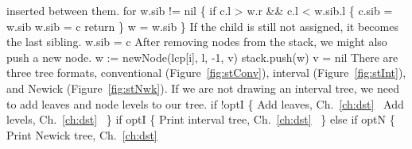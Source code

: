 inserted between them.
\nwenddocs{}\endmoddef\nwstartdeflinemarkup{}\nwenddeflinemarkup
for w.sib != nil \{
          if c.l > w.r && c.l < w.sib.l \{
                  c.sib = w.sib
                  w.sib = c
                  return
          \}
          w = w.sib
\}
\nwendcode{}\nwdocspar
If the child is still not assigned, it becomes the last sibling.
\nwenddocs{}\endmoddef\nwstartdeflinemarkup{}\nwenddeflinemarkup
w.sib = c
\nwendcode{}\nwdocspar
After removing nodes from the stack, we might also push a new node.
\nwenddocs{}\endmoddef\nwstartdeflinemarkup{}\nwenddeflinemarkup
w := newNode(lcp[i], l, -1, v)
stack.push(w)
v = nil
\nwendcode{}\nwdocspar
There are three tree formats, conventional (Figure~\ref{fig:stConv}),
interval (Figure~\ref{fig:stInt}), and Newick
(Figure~\ref{fig:stNwk}). If we are not drawing an interval tree, we
need to add leaves and node levels to our tree.
\nwenddocs{}\endmoddef\nwstartdeflinemarkup{}\nwenddeflinemarkup
if !optI \{
          \LA{}Add leaves, Ch.~\ref{ch:dst}~{\nwtagstyle{}}\RA{}
          \LA{}Add levels, Ch.~\ref{ch:dst}~{\nwtagstyle{}}\RA{}
\}
if optI \{
          \LA{}Print interval tree, Ch.~\ref{ch:dst}~{\nwtagstyle{}}\RA{}
\} else if optN \{
          \LA{}Print Newick tree, Ch.~\ref{ch:dst}~{\nwtagstyle{}}\RA{}
